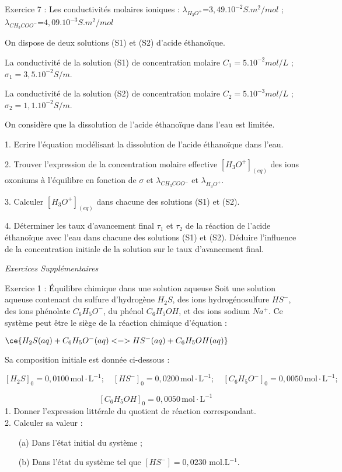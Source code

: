 \documentclass[12pt, french]{article}
\begin{document}
\begin{Box2}{Exercice 7 : }
	Les conductivités molaires ioniques : $\lambda_{H_3O^+}$=$3,49.10^{-2}S.m^2/mol$ ; $\lambda_{CH_3COO^-}$=$4,09.10^{-3}S.m^2/mol$

	On dispose de deux solutions (S1) et (S2) d’acide éthanoïque.

	La conductivité de la solution (S1) de concentration molaire $C_1=5.10^{-2}mol/L$ ; $\sigma_1= 3,5.10^{-2}S/m$.

	La conductivité de la solution (S2) de concentration molaire $C_2=5.10^{-3}mol/L$ ; $\sigma_2=1,1.10^{-2}S/m$.

	On considère que la dissolution de l’acide éthanoïque dans l’eau est limitée.

1. Ecrire l’équation modélisant la dissolution de l’acide éthanoïque dans l’eau.

2. Trouver l’expression de la concentration molaire effective $[H_3O^+]_{(eq)}$ des ions oxoniums à l’équilibre en
fonction de $\sigma$ et $\lambda_{CH_3COO^-}$ et $\lambda_{H_3O^+}$.

3. Calculer $[H_3O^+]_{(eq)}$ dans chacune des solutions (S1) et (S2).

4. Déterminer les taux d’avancement final $\tau_1$ et $\tau_2$ de la réaction de l’acide éthanoïque avec l’eau dans chacune
des solutions (S1) et (S2). Déduire l’influence de la concentration initiale de la solution sur le taux
d’avancement final.

\end{Box2}
\begin{center}
   \Large{ \em{Exercices Supplémentaires}}

\end{center}

\begin{Box2}{Exercice 1 : Équilibre chimique dans une solution aqueuse}
  Soit une solution aqueuse contenant du sulfure d’hydrogène $H_2S$, des ions hydrogénosulfure $HS^-$, des ions phénolate $C_6 H_5O^-$, du phénol $C_6H_5OH$, et des ions sodium $Na^+$. Ce système peut être le siège de la réaction chimique d’équation :

  $\ce{H_2 S(aq) + C_6 H_5 O^- (aq) <=> HS^- (aq) + C_6 H_5 OH (aq)}$

Sa composition initiale est donnée ci-dessous :

\[
[H_2 S]_0 = 0, 0100 \, 
  \text{mol} \cdot \text{L}^{-1}; \quad [HS^-]_0 = 0,0200 \, \text{mol} \cdot \text{L}^{-1}; \quad [C_6 H_5 O^-]_0 = 0,0050 \, \text{mol} \cdot \text{L}^{-1};
  \]

  \[
  \quad [C_6 H_5 OH]_0 = 0,0050 \, \text{mol} \cdot \text{L}^{-1}
\]
1. Donner l’expression littérale du quotient de réaction correspondant.\\
2. Calculer sa valeur :
   \begin{itemize}
       \item[(a)] Dans l’état initial du système ;
       \item[(b)] Dans l’état du système tel que $[HS^-] = 0,0230$ mol.L$^{-1}$.
   \end{itemize}
\end{Box2}
\end{document}
